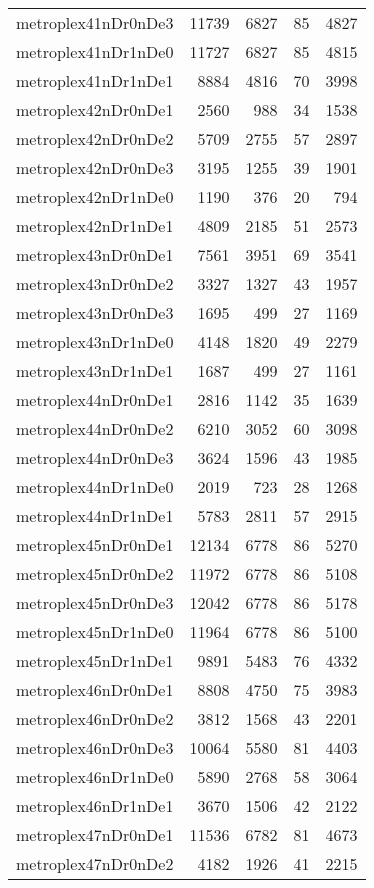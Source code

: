 \begin{longtable}{lrrrr}
metroplex41nDr0nDe3 & 11739 & 6827 & 85 & 4827 \\
metroplex41nDr1nDe0 & 11727 & 6827 & 85 & 4815 \\
metroplex41nDr1nDe1 & 8884 & 4816 & 70 & 3998 \\
metroplex42nDr0nDe1 & 2560 & 988 & 34 & 1538 \\
metroplex42nDr0nDe2 & 5709 & 2755 & 57 & 2897 \\
metroplex42nDr0nDe3 & 3195 & 1255 & 39 & 1901 \\
metroplex42nDr1nDe0 & 1190 & 376 & 20 & 794 \\
metroplex42nDr1nDe1 & 4809 & 2185 & 51 & 2573 \\
metroplex43nDr0nDe1 & 7561 & 3951 & 69 & 3541 \\
metroplex43nDr0nDe2 & 3327 & 1327 & 43 & 1957 \\
metroplex43nDr0nDe3 & 1695 & 499 & 27 & 1169 \\
metroplex43nDr1nDe0 & 4148 & 1820 & 49 & 2279 \\
metroplex43nDr1nDe1 & 1687 & 499 & 27 & 1161 \\
metroplex44nDr0nDe1 & 2816 & 1142 & 35 & 1639 \\
metroplex44nDr0nDe2 & 6210 & 3052 & 60 & 3098 \\
metroplex44nDr0nDe3 & 3624 & 1596 & 43 & 1985 \\
metroplex44nDr1nDe0 & 2019 & 723 & 28 & 1268 \\
metroplex44nDr1nDe1 & 5783 & 2811 & 57 & 2915 \\
metroplex45nDr0nDe1 & 12134 & 6778 & 86 & 5270 \\
metroplex45nDr0nDe2 & 11972 & 6778 & 86 & 5108 \\
metroplex45nDr0nDe3 & 12042 & 6778 & 86 & 5178 \\
metroplex45nDr1nDe0 & 11964 & 6778 & 86 & 5100 \\
metroplex45nDr1nDe1 & 9891 & 5483 & 76 & 4332 \\
metroplex46nDr0nDe1 & 8808 & 4750 & 75 & 3983 \\
metroplex46nDr0nDe2 & 3812 & 1568 & 43 & 2201 \\
metroplex46nDr0nDe3 & 10064 & 5580 & 81 & 4403 \\
metroplex46nDr1nDe0 & 5890 & 2768 & 58 & 3064 \\
metroplex46nDr1nDe1 & 3670 & 1506 & 42 & 2122 \\
metroplex47nDr0nDe1 & 11536 & 6782 & 81 & 4673 \\
metroplex47nDr0nDe2 & 4182 & 1926 & 41 & 2215 \\

\end{longtable}
